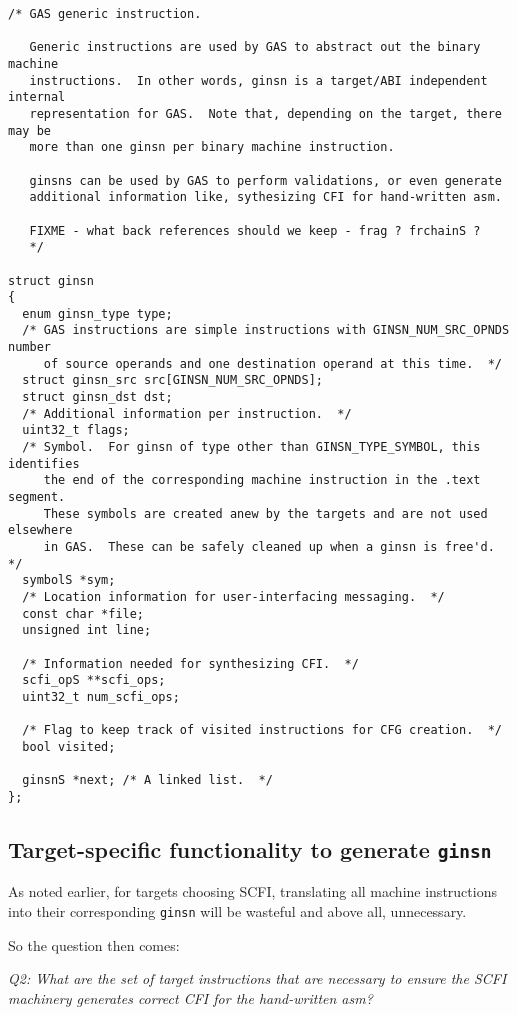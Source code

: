 \documentclass{article} \usepackage[a4paper, total={6in, 8in}]{geometry}
\begin{document}
\begin{verbatim}
/* GAS generic instruction.

   Generic instructions are used by GAS to abstract out the binary machine
   instructions.  In other words, ginsn is a target/ABI independent internal
   representation for GAS.  Note that, depending on the target, there may be
   more than one ginsn per binary machine instruction.

   ginsns can be used by GAS to perform validations, or even generate
   additional information like, sythesizing CFI for hand-written asm.

   FIXME - what back references should we keep - frag ? frchainS ?
   */

struct ginsn
{
  enum ginsn_type type;
  /* GAS instructions are simple instructions with GINSN_NUM_SRC_OPNDS number
     of source operands and one destination operand at this time.  */
  struct ginsn_src src[GINSN_NUM_SRC_OPNDS];
  struct ginsn_dst dst;
  /* Additional information per instruction.  */
  uint32_t flags;
  /* Symbol.  For ginsn of type other than GINSN_TYPE_SYMBOL, this identifies
     the end of the corresponding machine instruction in the .text segment.
     These symbols are created anew by the targets and are not used elsewhere
     in GAS.  These can be safely cleaned up when a ginsn is free'd.  */
  symbolS *sym;
  /* Location information for user-interfacing messaging.  */
  const char *file;
  unsigned int line;

  /* Information needed for synthesizing CFI.  */
  scfi_opS **scfi_ops;
  uint32_t num_scfi_ops;

  /* Flag to keep track of visited instructions for CFG creation.  */
  bool visited;

  ginsnS *next; /* A linked list.  */
};
\end{verbatim}

\subsection{Target-specific functionality to generate \texttt{ginsn}}
As noted earlier, for targets choosing SCFI, translating all machine
instructions into their corresponding \texttt{ginsn} will be wasteful and above
all, unnecessary.

So the question then comes:

\begin{center}
\emph{Q2: What are the set of target instructions that are necessary to ensure the
SCFI machinery generates correct CFI for the hand-written asm?}
\end{center}
\end{document}
